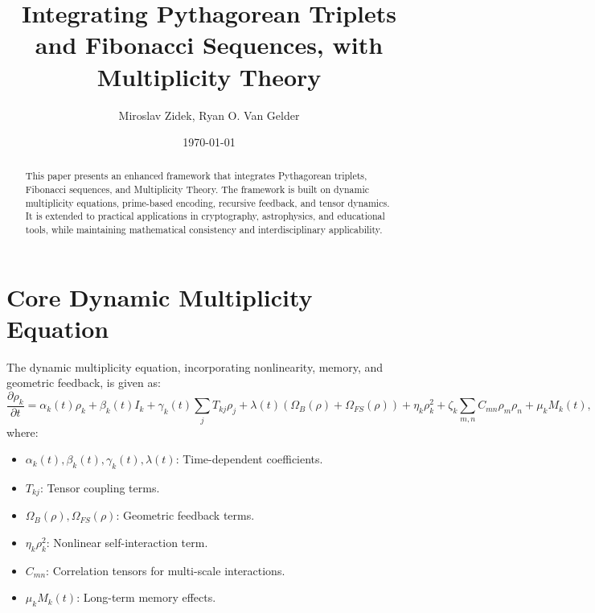 \documentclass{article}
\theoremstyle{plain}
\begin{document}
\title{Integrating Pythagorean Triplets and Fibonacci Sequences, with Multiplicity Theory}
\author{Miroslav Zidek, Ryan O. Van Gelder}
\date{\today}
\maketitle
\begin{abstract}
This paper presents an enhanced framework that integrates Pythagorean triplets, Fibonacci sequences, and Multiplicity Theory. The framework is built on dynamic multiplicity equations, prime-based encoding, recursive feedback, and tensor dynamics. It is extended to practical applications in cryptography, astrophysics, and educational tools, while maintaining mathematical consistency and interdisciplinary applicability.
\end{abstract}

\section{Core Dynamic Multiplicity Equation}
The dynamic multiplicity equation, incorporating nonlinearity, memory, and geometric feedback, is given as:
\begin{equation}
    \frac{\partial \rho_k}{\partial t} = \alpha_k(t) \rho_k + \beta_k(t) I_k + \gamma_k(t) \sum_{j} T_{kj} \rho_j + \lambda(t) (\Omega_B(\rho) + \Omega_{FS}(\rho)) + \eta_k \rho_k^2 + \zeta_k \sum_{m,n} C_{mn} \rho_m \rho_n + \mu_k M_k(t),
\end{equation}
where:
\begin{itemize}
    \item $\alpha_k(t), \beta_k(t), \gamma_k(t), \lambda(t)$: Time-dependent coefficients.
    \item $T_{kj}$: Tensor coupling terms.
    \item $\Omega_B(\rho), \Omega_{FS}(\rho)$: Geometric feedback terms.
    \item $\eta_k \rho_k^2$: Nonlinear self-interaction term.
    \item $C_{mn}$: Correlation tensors for multi-scale interactions.
    \item $\mu_k M_k(t)$: Long-term memory effects.
\end{itemize}
\end{document}
